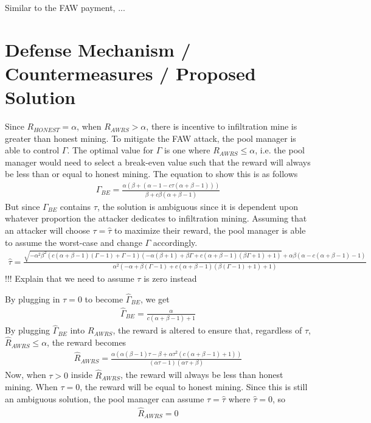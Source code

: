 \documentclass[runningheads]{llncs}
\begin{document}
Similar to the FAW payment, ...

\section{Defense Mechanism / Countermeasures / Proposed Solution}
Since $R_{HONEST}=\alpha$, when $R_{AWRS}>\alpha$, there is incentive to infiltration mine is greater than honest mining. To mitigate the FAW attack, the pool manager is able to control $\Gamma$. The optimal value for $\Gamma$ is one where $R_{AWRS}\leq\alpha$, i.e. the pool manager would need to select a break-even value such that the reward will always be less than or equal to honest mining. The equation to show this is as follows
\begin{eqnarray}
\Gamma_{BE}=\frac{\alpha(\beta+(\alpha-1-c\tau(\alpha+\beta-1)))}{\beta+c\beta(\alpha+\beta-1)}
\end{eqnarray}
 But since $\Gamma_{BE}$ contains $\tau$, the solution is ambiguous since it is dependent upon whatever proportion the attacker dedicates to infiltration mining. Assuming that an attacker will choose $\tau=\hat{\tau}$ to maximize their reward, the pool manager is able to assume the worst-case and change $\Gamma$ accordingly.
\begin{eqnarray}
\hat{\tau}=\frac{\sqrt{-\alpha ^2 \beta ^2 (c (\alpha +\beta -1) (\Gamma -1)+\Gamma -1) (-\alpha  (\beta +1)+\beta  \Gamma +c (\alpha +\beta -1) (\beta \Gamma +1)+1)}+\alpha  \beta  (\alpha -c (\alpha +\beta -1)-1)}{\alpha ^2 (-\alpha +\beta  (\Gamma -1)+c (\alpha +\beta -1) (\beta  (\Gamma -1)+1)+1)}
\end{eqnarray}
!!! Explain that we need to assume $\tau$ is zero instead

By plugging in $\tau=0$ to become $\hat{\Gamma}_{BE}$, we get
\begin{eqnarray}
\hat{\Gamma}_{BE}=\frac{\alpha }{c (\alpha +\beta -1)+1}
\end{eqnarray}
By plugging $\hat{\Gamma}_{BE}$ into $R_{AWRS}$, the reward is altered to ensure that, regardless of $\tau$, $\hat{R}_{AWRS}\leq\alpha$, the reward becomes
\begin{eqnarray}
\hat{R}_{AWRS}=\frac{\alpha  \left(\alpha  (\beta -1) \tau -\beta +\alpha  \tau ^2 (c (\alpha +\beta -1)+1)\right)}{(\alpha  \tau -1) (\alpha  \tau +\beta )}
\end{eqnarray}
Now, when $\tau>0$ inside $\hat{R}_{AWRS}$, the reward will always be less than honest mining. When $\tau=0$, the reward will be equal to honest mining. Since this is still an ambiguous solution, the pool manager can assume $\tau=\hat{\tau}$ where $\hat{\tau}=0$, so
\begin{eqnarray}
\hat{R}_{AWRS}=0
\end{eqnarray}
\end{document}
